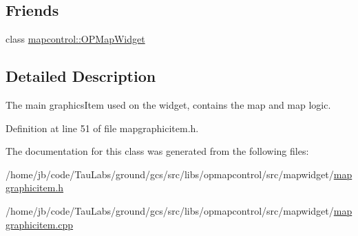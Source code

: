 \subsection*{\-Friends}
\begin{DoxyCompactItemize}
\item 
class \hyperlink{group___o_p_map_widget_gaab6f3be35d4d41ee35530f402954d903}{mapcontrol\-::\-O\-P\-Map\-Widget}
\end{DoxyCompactItemize}


\subsection{\-Detailed \-Description}
\-The main graphics\-Item used on the widget, contains the map and map logic. 

\-Definition at line 51 of file mapgraphicitem.\-h.



\-The documentation for this class was generated from the following files\-:\begin{DoxyCompactItemize}
\item 
/home/jb/code/\-Tau\-Labs/ground/gcs/src/libs/opmapcontrol/src/mapwidget/\hyperlink{mapgraphicitem_8h}{mapgraphicitem.\-h}\item 
/home/jb/code/\-Tau\-Labs/ground/gcs/src/libs/opmapcontrol/src/mapwidget/\hyperlink{mapgraphicitem_8cpp}{mapgraphicitem.\-cpp}\end{DoxyCompactItemize}
